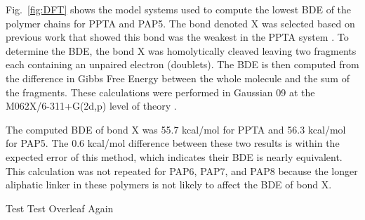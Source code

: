 \documentclass[journal=langd5,manuscript=article]{achemso}
\begin{document}
Fig.~\ref{fig:DFT} shows the model systems used to compute the 
lowest BDE of the polymer chains for PPTA and PAP5.
The bond denoted X was selected based on previous work 
that showed this bond was the weakest in the PPTA system \cite{mercer2017molecular}.
To determine the BDE, the bond X was homolytically cleaved leaving
two fragments each containing an unpaired electron (doublets).
The BDE is then computed from the
difference in Gibbs Free Energy between the whole
molecule and the sum of the fragments.
These calculations were performed in Gaussian 09 \cite{g09}
at the M062X/6-311+G(2d,p) level of theory \cite{zhao_2008,mclean_1980}.

The computed BDE of bond X was 55.7 kcal/mol for PPTA and
56.3 kcal/mol for PAP5.
The 0.6 kcal/mol difference between these two results is
within the expected error of this method, which indicates
their BDE is nearly equivalent.
This calculation was not repeated for PAP6, PAP7, and PAP8 because
the longer aliphatic linker in these polymers is not likely to affect the BDE of bond X.

Test
Test Overleaf Again
\FloatBarrier

\end{document}
